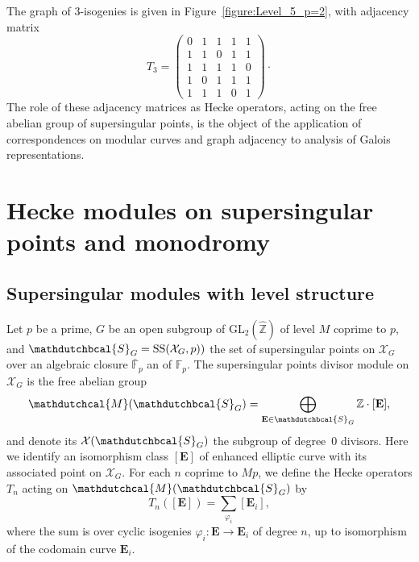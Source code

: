 \documentclass{amsart}
\newcommand{\cM}{\mathdutchcal{M}}
\newcommand{\cS}{\mathdutchbcal{S}}
\newcommand{\cX}{\mathcal{X}}
\newcommand{\EE}{\mathbf{E}}
\newcommand{\FF}{\mathbb{F}}
\newcommand{\QQ}{\mathbb{Q}}
\newcommand{\ZZ}{\mathbb{Z}}
\newcommand{\GL}{\mathrm{GL}}
\renewcommand{\SS}{\mathrm{SS}}
\renewcommand{\SS}{\mathrm{SS}}
\begin{document}
The graph of $3$-isogenies is given in Figure~\ref{figure:Level_5_p=2}, with adjacency matrix
$$
T_3 = 
\left(
\begin{array}{ccccc}
0 & 1 & 1 & 1 & 1\\
1 & 1 & 0 & 1 & 1\\
1 & 1 & 1 & 1 & 0\\
1 & 0 & 1 & 1 & 1\\
1 & 1 & 1 & 0 & 1
\end{array}
\right)\cdot
$$
The role of these adjacency matrices as Hecke operators, acting on the free
abelian group of supersingular points, is the object of the application of
correspondences on modular curves and graph adjacency to analysis of Galois
representations.

\section{Hecke modules on supersingular points and monodromy}


\subsection*{Supersingular modules with level structure}
Let $p$ be a prime, $G$ be an open subgroup of $\GL_2(\hat{\ZZ})$ of level $M$
coprime to $p$, and $\cS_G = \SS(\cX_G,p))$ the set of supersingular points on
$\cX_G$ over an algebraic closure $\bar{\FF}_p$ an of $\FF_p$. The supersingular
points divisor module on $\cX_G$ is the free abelian group
$$
\cM(\cS_G) = \bigoplus_{\EE\in\cS_G} \ZZ\cdot[\EE],
$$
and denote its $\cX(\cS_G)$ the subgroup of degree~$0$ divisors. Here we identify
an isomorphism class $[\EE]$ of enhanced elliptic curve with its associated point
on $\cX_G$.  For each $n$ coprime to $Mp$, we define the Hecke operators $T_n$
acting on $\cM(\cS_G)$ by
$$
T_n([\EE]) = \sum_{\varphi_i} [\EE_i],
$$
where the sum is over cyclic isogenies $\varphi_i: \EE \longrightarrow \EE_i$
of degree $n$, up to isomorphism of the codomain curve $\EE_i$.
\end{document}
